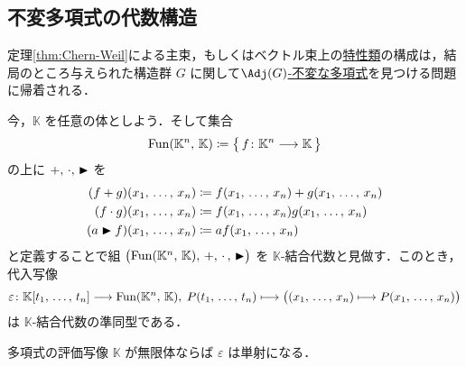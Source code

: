 \documentclass[TQFT_main]{subfiles}
\begin{document}
\subsection{不変多項式の代数構造}

定理\ref{thm:Chern-Weil}による主束，もしくはベクトル束上の\hyperref[def:characteristic-class-polynomial]{特性類}の構成は，結局のところ与えられた構造群 $G$ に関して\hyperref[def:invariant]{$\Adj(G)$-不変な多項式}を見つける問題に帰着される．

今，$\mathbb{K}$ を任意の体としよう．そして集合
\begin{align}
    \mathrm{Fun}(\mathbb{K}^n,\, \mathbb{K}) \coloneqq \bigl\{\, f \colon \mathbb{K}^n \longrightarrow \mathbb{K}  \,\bigr\} 
\end{align}
の上に $+,\, \cdot,\, \blacktriangleright$ を
\begin{align}
    (f + g)(x_1,\, \dots,\, x_n) &\coloneqq f(x_1,\, \dots,\, x_n) + g(x_1,\, \dots,\, x_n) \\
    (f \cdot g)(x_1,\, \dots,\, x_n) &\coloneqq f(x_1,\, \dots,\, x_n) g(x_1,\, \dots,\, x_n) \\
    (a \blacktriangleright f)(x_1,\, \dots,\, x_n) &\coloneqq a f(x_1,\, \dots,\, x_n)
\end{align}
と定義することで組 $\bigl( \mathrm{Fun}(\mathbb{K}^n,\, \mathbb{K}),\, +,\, \cdot\, , \, \blacktriangleright  \bigr)$ を $\mathbb{K}$-結合代数と見做す．このとき，代入写像
\begin{align}
    \varepsilon \colon \mathbb{K}[t_1,\, \dots,\, t_n] \longrightarrow \mathrm{Fun}(\mathbb{K}^n,\, \mathbb{K}),\; P(t_1,\, \dots,\, t_n) \longmapsto \bigl( (x_1,\, \dots,\, x_n) \longmapsto P(x_1,\, \dots,\, x_n)\bigr) 
\end{align}
は $\mathbb{K}$-結合代数の準同型である．

\begin{mylem}[label=lem:polynomial-eval-injective]{多項式の評価写像}
    $\mathbb{K}$ が無限体ならば $\varepsilon$ は単射になる．
\end{mylem}
\end{document}
